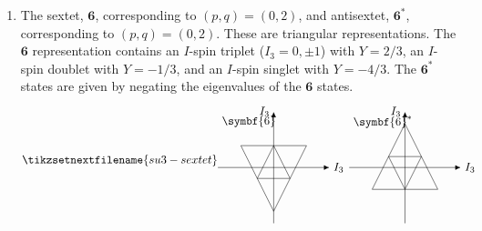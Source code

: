 \documentclass[fleqn]{NotesClass}
\newcommand{\rep}[1]{\symbf{#1}}
\begin{document}
\begin{enumerate}
        \item The sextet, \(\rep{6}\), corresponding to \((p, q) = (0, 2)\), and antisextet, \(\rep{6}^*\), corresponding to \((p, q) = (0, 2)\).
        These are triangular representations.
        The \(\rep{6}\) representation contains an \(I\)-spin triplet (\(I_3 = 0, \pm 1\)) with \(Y = 2/3\), an \(I\)-spin doublet with \(Y = -1/3\), and an \(I\)-spin singlet with \(Y = -4/3\).
        The \(\rep{6}^*\) states are given by negating the eigenvalues of the \(\rep{6}\) states.
        \begin{equation}
            \tikzsetnextfilename{su3-sextet}
            \begin{tikzpicture}[
                >={Latex[width=1.5mm]},
                baseline = (current bounding box)
                ]
                \node[below right] at (-1.7, 1.7) {\(\rep{6}\)};
                \draw (1, 2/3) -- (-1, 2/3) -- (0, -4/3) -- cycle;
                \draw (1/2, -1/3) -- (0, 2/3) -- (-1/2, -1/3) -- cycle;
                \draw[->] (-1.7, 0) -- (1.7, 0) node [right] {\(I_3\)};
                \draw[->] (0, -1.7) -- (0, 1.7) node [left] {\(I_3\)};
                
                \begin{scope}[xshift=4cm]
                    \node[below right] at (-1.7, 1.7) {\(\rep{6}^*\)};
                    \draw (1, -2/3) -- (-1, -2/3) -- (0, 4/3) -- cycle;
                    \draw (1/2, 1/3) -- (0, -2/3) -- (-1/2, 1/3) -- cycle;
                    \draw[->] (-1.7, 0) -- (1.7, 0) node [right] {\(I_3\)};
                    \draw[->] (0, -1.7) -- (0, 1.7) node [left] {\(I_3\)};
                \end{scope}
            \end{tikzpicture}
        \end{equation}
        

\end{enumerate}
\end{document}
